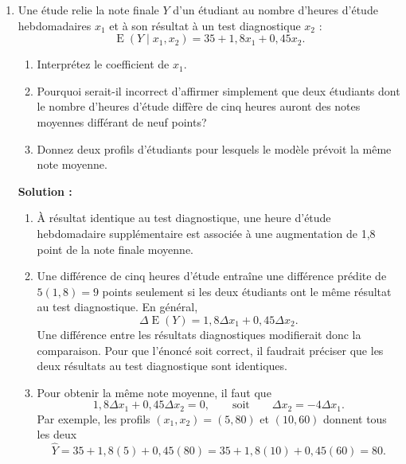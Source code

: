 \documentclass[letter, 11pt]{article}
\newcommand{\E}{\operatorname{E}}
\newcommand{\prof}[1]{\begin{professeur}\color{blue} {\bf Solution :} #1 \end{professeur}}
\begin{document}
\begin{enumerate}[leftmargin=*, wide, label=\bf Exercice \arabic*:]
{\begin{enumerate}[label=\alph*)]
  \item Pour des valeurs identiques de $x_1$ et $x_3$, une augmentation d'une
        unité de $x_2$ produit
        \[
          \Delta\widehat{Y}=18{,}5
        \]
        milliers de dollars. Le prix prédit de la seconde maison est donc
        supérieur de 18~500~\$.

\end{enumerate}

}



\item 
Une étude relie la note finale $Y$ d'un étudiant au nombre d'heures d'étude
hebdomadaires $x_1$ et à son résultat à un test diagnostique $x_2$ :
\[
  \E(Y\mid x_1,x_2)=35+1{,}8x_1+0{,}45x_2.
\]

\begin{enumerate}[label=\alph*)]
  \item Interprétez le coefficient de $x_1$.
  \item Pourquoi serait-il incorrect d'affirmer simplement que deux étudiants
        dont le nombre d'heures d'étude diffère de cinq heures auront des notes
        moyennes différant de neuf points?
  \item Donnez deux profils d'étudiants pour lesquels le modèle prévoit la
        même note moyenne.
\end{enumerate}

\prof{
\begin{enumerate}[label=\alph*)]
  \item À résultat identique au test diagnostique, une heure d'étude
        hebdomadaire supplémentaire est associée à une augmentation de
        1,8 point de la note finale moyenne.

  \item Une différence de cinq heures d'étude entraîne une différence prédite
        de $5(1{,}8)=9$ points seulement si les deux étudiants ont le même
        résultat au test diagnostique. En général,
        \[
          \Delta\E(Y)=1{,}8\Delta x_1+0{,}45\Delta x_2.
        \]
        Une différence entre les résultats diagnostiques modifierait donc la
        comparaison. Pour que l'énoncé soit correct, il faudrait préciser que les deux résultats au test diagnostique sont identiques.

  \item Pour obtenir la même note moyenne, il faut que
        \[
          1{,}8\Delta x_1+0{,}45\Delta x_2=0,
          \qquad\text{soit}\qquad
          \Delta x_2=-4\Delta x_1.
        \]
        Par exemple, les profils $(x_1,x_2)=(5,80)$ et $(10,60)$ donnent tous
        les deux
        \[
          \widehat{Y}=35+1{,}8(5)+0{,}45(80)
                     =35+1{,}8(10)+0{,}45(60)=80.
        \]
\end{enumerate}
}



\end{enumerate}
\end{document}
